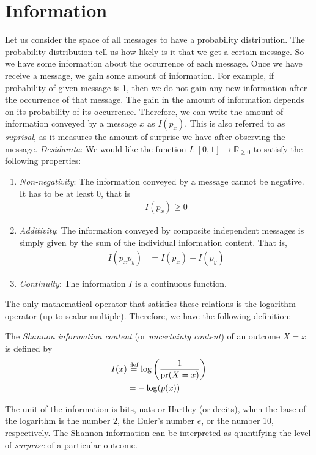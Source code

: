 \documentclass[a4paper, 12pt]{book} %
\begin{document}
\section{Information}
Let us consider the space of all messages to have a probability distribution. The probability distribution tell us how likely is it that we get a certain message. So we have some information about the occurrence of each message. Once we have receive a message, we gain some amount of information. For example, if probability of given message is 1, then we do not gain any new information after the occurrence of that message. The gain in the amount of information depends on its probability of its occurrence. Therefore, we can write the amount of information conveyed by a message $x$ as $I(p_x)$. This is also referred to as \emph{suprisal}, as it measures the amount of surprise we have after observing the message. \emph{Desidarata}: We would like the function $I: [0,1] \longrightarrow \mathbb{R}_{\geq 0}$ to satisfy the following properties:
\begin{enumerate}
    \item \emph{Non-negativity}: The information conveyed by a message cannot be negative. It has to be at least 0, that is
    \begin{align}
        I(p_x) \geq 0
    \end{align}
    \item \emph{Additivity}: The information conveyed by composite independent messages is simply given by the sum of the individual information content. That is,
    \begin{align}
        I(p_x p_y) &= I(p_x) + I(p_y)
    \end{align}
    \item \emph{Continuity}: The information $I$ is a continuous function.
\end{enumerate}


The only mathematical operator that satisfies these relations is the logarithm operator (up to scalar multiple). Therefore, we have the following definition:
\begin{definition}
    The \emph{Shannon} \emph{information content} (or \emph{uncertainty content}) of an outcome $X = x$ is defined by
    \begin{align}
    I(x) &\overset{\text{def}}{=} \log\left(  \frac{1}{\operatorname{pr}(X = x)} \right) \\
    &= -\log(p(x))
    \end{align}
\end{definition}
The unit of the information is bits, nats or Hartley (or decits), when the base of the logarithm is the number $2$, the Euler's number $e$, or the number 10, respectively. The Shannon information can be interpreted as quantifying the level of \emph{surprise} of a particular outcome.
\end{document}
